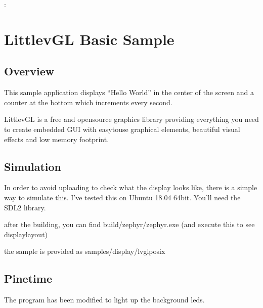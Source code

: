 \documentclass[letterpaper,10pt,english]{sphinxmanual}
\begin{document}
:


\chapter{LittlevGL Basic Sample}
\label{\detokenize{lvgl:littlevgl-basic-sample}}\label{\detokenize{lvgl:lvgl-sample}}\label{\detokenize{lvgl::doc}}

\section{Overview}
\label{\detokenize{lvgl:overview}}
This sample application displays “Hello World” in the center of the screen
and a counter at the bottom which increments every second.

LittlevGL is a free and open\sphinxhyphen{}source graphics library providing everything you need to create embedded GUI with easy\sphinxhyphen{}to\sphinxhyphen{}use graphical elements, beautiful visual effects and low memory footprint.


\section{Simulation}
\label{\detokenize{lvgl:simulation}}
In order to avoid uploading to check what the display looks like, there is a simple way to simulate this.
I’ve tested this on Ubuntu 18.04 64bit. You’ll need the SDL2 library.

\begin{sphinxVerbatim}[commandchars=\\\{\}]
\end{sphinxVerbatim}

after the building, you can find build/zephyr/zephyr.exe (and execute this to see display\sphinxhyphen{}layout)

the sample is provided as samples/display/lvgl\sphinxhyphen{}posix


\section{Pinetime}
\label{\detokenize{lvgl:pinetime}}
The program has been modified to light up the background leds.
\end{document}
